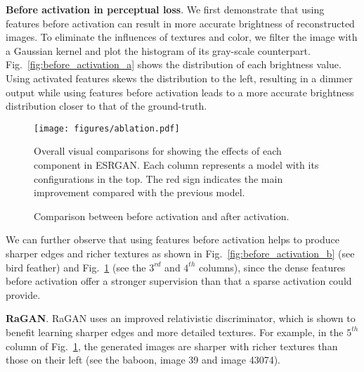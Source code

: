\documentclass[runningheads]{llncs}
\begin{document}
\noindent \textbf{Before activation in perceptual loss}.
We first demonstrate that using features before activation can result in more accurate brightness of reconstructed 
images.
To eliminate the influences of textures and color, we filter the image with a Gaussian kernel and plot the 
histogram of its gray-scale counterpart. 
%
Fig.~\ref{fig:before_activation_a} shows the distribution of each brightness value.
%
Using activated features skews the distribution to the left, resulting in a dimmer output while using 
features before activation leads to a more accurate brightness distribution closer to that of the ground-truth.

\begin{figure}[htbp]
	\begin{center}
		\texttt{[image: figures/ablation.pdf]}
	\end{center}
	\vspace{-0.3cm}
	\caption{Overall visual comparisons for showing the effects of each component in ESRGAN. Each column represents a 
		model with its configurations in the top. The red sign indicates the main improvement compared with the 
		previous 
		model.}
	\label{fig:ablation}
	\vspace{-0.3cm}
\end{figure}
\begin{figure}[htbp]%
	\centering
	\qquad
	\caption{Comparison between before activation and after activation.}%
	\label{fig:before_activation}%
	\vspace{-0.4cm}
\end{figure}


We can further observe that using features before activation helps to produce sharper edges and richer textures as 
shown in Fig.~\ref{fig:before_activation_b} (see bird feather) and Fig.~\ref{fig:ablation} (see the $3^{rd}$ and 
$4^{th}$ columns), since the dense features before activation offer a stronger supervision than that a sparse 
activation could provide.

\noindent \textbf{RaGAN}. RaGAN uses an improved relativistic discriminator, which is shown to benefit learning 
sharper edges and more detailed textures. 
%
For example, in the $5^{th}$ column of Fig.~\ref{fig:ablation}, the generated images are sharper with richer textures 
than those on their left (see the baboon, image 39 and image 43074).
\end{document}
